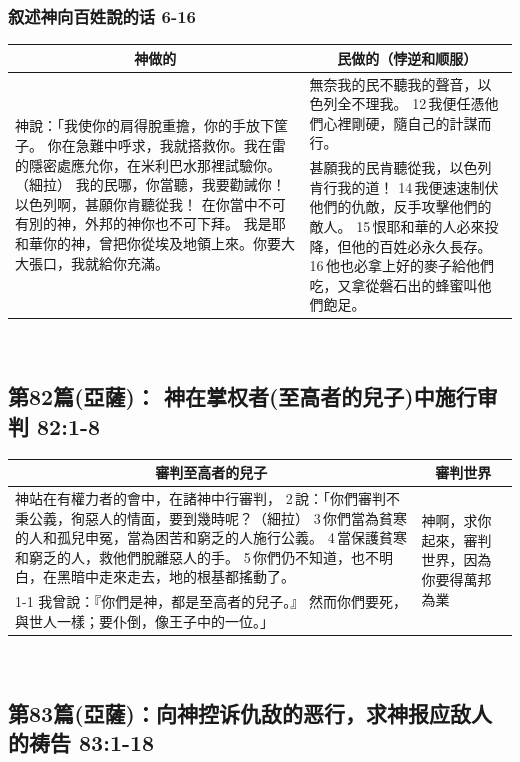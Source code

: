 \subsubsection{叙述神向百姓說的话 6-16}
\begin{table}[H]
\centering
\begin{tabular}{p{8.3cm}|p{8.5cm}}\hline\hline
\multicolumn{1}{c|}{神做的}&\multicolumn{1}{c}{民做的（悖逆和顺服）}\\\hline
\multirow{2}{8.5cm}{神說：「我使你的肩得脫重擔，你的手放下筐子。
你在急難中呼求，我就搭救你。我在雷的隱密處應允你，在米利巴水那裡試驗你。（細拉）
我的民哪，你當聽，我要勸誡你！以色列啊，甚願你肯聽從我！
在你當中不可有別的神，外邦的神你也不可下拜。
我是耶和華你的神，曾把你從埃及地領上來。你要大大張口，我就給你充滿。}
&無奈我的民不聽我的聲音，以色列全不理我。
12 我便任憑他們心裡剛硬，隨自己的計謀而行。\\\cline{2-2}
&甚願我的民肯聽從我，以色列肯行我的道！
14 我便速速制伏他們的仇敵，反手攻擊他們的敵人。
15 恨耶和華的人必來投降，但他的百姓必永久長存。
16 他也必拿上好的麥子給他們吃，又拿從磐石出的蜂蜜叫他們飽足。\\\hline
\end{tabular}
\end{table} 

\subsection{第82篇(亞薩)： 神在掌权者(至高者的兒子)中施行审判  82:1-8}
\begin{table}[H]
\centering
\begin{tabular}{p{15.25cm}|p{2.2cm}}\hline\hline
\multicolumn{1}{c|}{審判至高者的兒子}&\multicolumn{1}{c}{審判世界}\\\hline
神站在有權力者的會中，在諸神中行審判，
2 說：「你們審判不秉公義，徇惡人的情面，要到幾時呢？（細拉）
3 你們當為貧寒的人和孤兒申冤，當為困苦和窮乏的人施行公義。
4 當保護貧寒和窮乏的人，救他們脫離惡人的手。
5 你們仍不知道，也不明白，在黑暗中走來走去，地的根基都搖動了。
&\multirow{2}{2.2cm}{神啊，求你起來，審判世界，因為你要得萬邦為業}\\\cline{1-1}
我曾說：『你們是神，都是至高者的兒子。』
然而你們要死，與世人一樣；要仆倒，像王子中的一位。」&\\\hline
\end{tabular}
\end{table} 



\subsection{第83篇(亞薩)：向神控诉仇敌的恶行，求神报应敌人的祷告 83:1-18}
